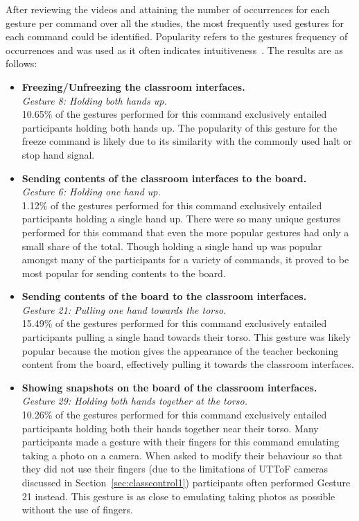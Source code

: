 \documentclass[manuscript, review, screen]{acmart}
\begin{document}
After reviewing the videos and attaining the number of occurrences for each gesture per command over all the studies, the most frequently used gestures for each command could be identified.
Popularity refers to the gestures frequency of occurrences and was used as it often indicates intuitiveness~\cite{Grandhi2011}.
The results are as follows: \\

\begin{itemize}
\item \textbf{Freezing/Unfreezing the classroom interfaces.}\\
\textit{Gesture 8: Holding both hands up.}\\  
10.65\% of the gestures performed for this command exclusively entailed participants holding both hands up.
The popularity of this gesture for the freeze command is likely due to its similarity with the commonly used halt or stop hand signal.\\

\item \textbf{Sending contents of the classroom interfaces to the board.}\\
\textit{Gesture 6: Holding one hand up.}\\
1.12\% of the gestures performed for this command exclusively entailed participants holding a single hand up.
There were so many unique gestures performed for this command that even the more popular gestures had only a small share of the total.
Though holding a single hand up was popular amongst many of the participants for a variety of commands, it proved to be most popular for sending contents to the board.\\

\item \textbf{Sending contents of the board to the classroom interfaces.}\\
\textit{Gesture 21: Pulling one hand towards the torso.}\\
15.49\% of the gestures performed for this command exclusively entailed participants pulling a single hand towards their torso.
This gesture was likely popular because the motion gives the appearance of the teacher beckoning content from the board, effectively pulling it towards the classroom interfaces.\\

\item \textbf{Showing snapshots on the board of the classroom interfaces.}\\
\textit{Gesture 29: Holding both hands together at the torso.}\\
10.26\% of the gestures performed for this command exclusively entailed participants holding both their hands together near their torso.
Many participants made a gesture with their fingers for this command emulating taking a photo on a camera.
When asked to modify their behaviour so that they did not use their fingers (due to the limitations of \ac{UTToF} cameras discussed in Section~\ref{sec:classcontrol1}) participants often performed Gesture 21 instead.
This gesture is as close to emulating taking photos as possible without the use of fingers.\\


\end{itemize}
\end{document}
